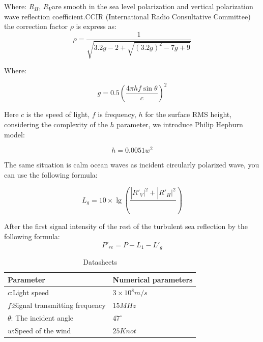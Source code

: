 \documentclass{mcmthesis}
\begin{document}
Where:
${R_H}$, $R_V$are smooth in the sea level polarization and vertical polarization wave reflection coefficient.CCIR (International Radio Consultative Committee) the correction factor $\rho$ is express as:
\begin{equation} \label{17}
\rho  = \frac{1}{{\sqrt {3.2g - 2 + \sqrt {{{(3.2g)}^2} - 7g + 9} } }}
\end{equation}

Where:

\begin{equation} \label{18}
g = 0.5{(\frac{{4\pi hf\sin \theta }}{c})^2}
\end{equation}

Here $c$ is the speed of light, $f$ is frequency, $h$ for the surface RMS height, considering the complexity of the $h$ parameter, we introduce Philip Hepburn model:

\begin{equation} \label{19}
h = 0.0051{w^2}
\end{equation}

The same situation is calm ocean waves as incident circularly polarized wave, you can use the following formula:

\begin{equation} \label{20}
{L_g} = 10 \times \lg (\frac{{|R{'_V}{|^2} + |R{'_H}{|^2}}}{{}})
\end{equation}

After the first signal intensity of the rest of the turbulent sea reflection by the following formula:
\begin{equation} \label{21}
P{'_{re}} = P - {L_1} - L{'_g}
\end{equation}

\begin{table}[!ht]

 \renewcommand\arraystretch{1.5}
 \setlength{\abovecaptionskip}{0pt}%
\setlength{\belowcaptionskip}{10pt}%
\begin{center}
\begin{tabular}{p{}p{}}
\toprule[1.8pt]
Parameter& Numerical parameters \\
 \midrule

$c$:Light speed & $3 \times {10^8}m/s$ \\

$f$:Signal transmitting frequency & $15MHz$  \\

$\theta$: The incident angle & ${47^ \circ }$  \\

$w$:Speed of the wind & $25Knot$  \\

 \bottomrule[2pt]
 \end{tabular}
 \end{center} 
 \caption{Datasheets}
 \end{table}
\end{document}
